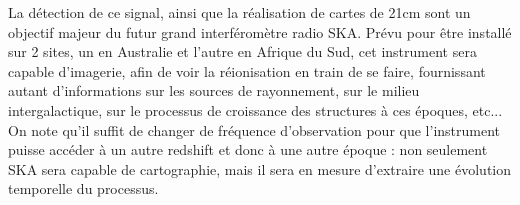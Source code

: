 La détection de ce signal, ainsi que la réalisation de cartes de 21cm sont un objectif majeur du futur grand interféromètre radio SKA. Prévu pour être installé sur 2 sites, un en Australie et l'autre en Afrique du Sud, cet instrument sera capable d'imagerie, afin de voir la réionisation en train de se faire, fournissant autant d'informations sur les sources de rayonnement, sur le milieu intergalactique, sur le processus de croissance des structures à ces époques, etc... On note qu'il suffit de changer de fréquence d'observation pour que l'instrument puisse accéder à un autre redshift et donc à une autre époque : non seulement SKA sera capable de cartographie, mais il sera en mesure d'extraire une évolution temporelle du processus.
 